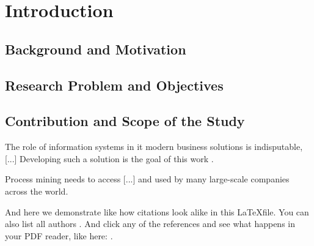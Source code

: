 \newpage\section{Introduction}

\subsection{Background and Motivation}

\subsection{Research Problem and Objectives}

\subsection{Contribution and Scope of the Study}

The role of information systems in \ac{it} modern business solutions is indisputable, [...] Developing such a solution is the goal of this work \parencite{venkatesh_usability_2014}. 

Process mining needs to access [...] and used by many large-scale companies \parencite{hoehle_espoused_2015} across the world.

And here we demonstrate like \parencite{hoehle_espoused_2015} how citations look alike in this \LaTeX file. You can also list all authors \parencite{venkatesh_usability_2014}. And click any of the references and see what happens in your PDF reader, like here: \textcite{university_of_arkansas_mobile_2015}.